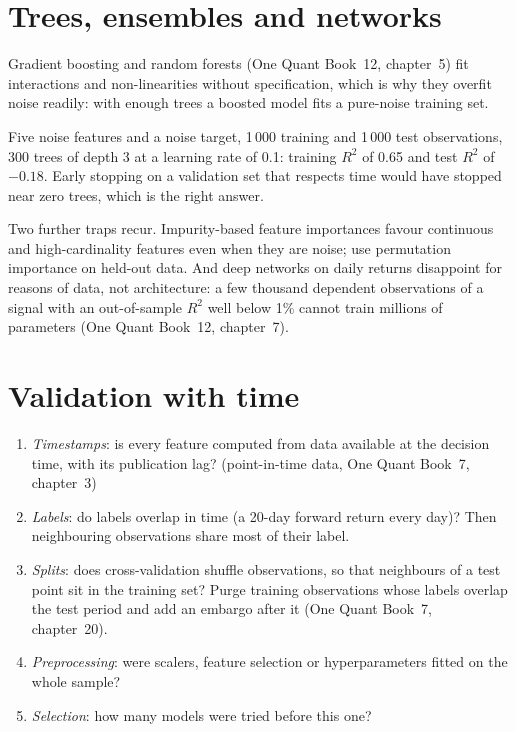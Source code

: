 \section{Trees, ensembles and networks}

Gradient boosting and random forests (One Quant Book~12, chapter~5) fit interactions and non-linearities without
specification, which is why they overfit noise readily: with enough trees a boosted model fits a pure-noise training set.

\begin{example}\label{ex:iv:machine-learning:boost}
Five noise features and a noise target, 1\,000 training and 1\,000 test observations, 300 trees of depth 3 at a learning
rate of 0.1: training $R^2$ of 0.65 and test $R^2$ of $-0.18$. Early stopping on a validation set that respects time would
have stopped near zero trees, which is the right answer.
\end{example}

Two further traps recur. Impurity-based feature importances favour continuous and high-cardinality features even when they
are noise; use permutation importance on held-out data. And deep networks on daily returns disappoint for reasons of data,
not architecture: a few thousand dependent observations of a signal with an out-of-sample $R^2$ well below 1\% cannot
train millions of parameters (One Quant Book~12, chapter~7).

\section{Validation with time}

\begin{method}\label{met:iv:machine-learning:leak}
\begin{enumerate}
\item \emph{Timestamps}: is every feature computed from data available at the decision time, with its publication lag?
(point-in-time data, One Quant Book~7, chapter~3)
\item \emph{Labels}: do labels overlap in time (a 20-day forward return every day)? Then neighbouring observations share
most of their label.
\item \emph{Splits}: does cross-validation shuffle observations, so that neighbours of a test point sit in the training set?
Purge training observations whose labels overlap the test period and add an embargo after it (One Quant Book~7,
chapter~20).
\item \emph{Preprocessing}: were scalers, feature selection or hyperparameters fitted on the whole sample?
\item \emph{Selection}: how many models were tried before this one?
\end{enumerate}
\end{method}

